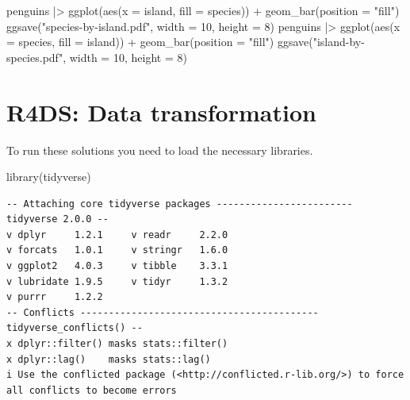 \documentclass[
  letterpaper,
  DIV=11,
  numbers=noendperiod]{scrreprt}
\newenvironment{Shaded}{\begin{snugshade}}{\end{snugshade}}
\newcommand{\AttributeTok}[1]{\textcolor[rgb]{0.40,0.45,0.13}{#1}}
\newcommand{\DecValTok}[1]{\textcolor[rgb]{0.68,0.00,0.00}{#1}}
\newcommand{\FunctionTok}[1]{\textcolor[rgb]{0.28,0.35,0.67}{#1}}
\newcommand{\NormalTok}[1]{\textcolor[rgb]{0.00,0.23,0.31}{#1}}
\newcommand{\SpecialCharTok}[1]{\textcolor[rgb]{0.37,0.37,0.37}{#1}}
\newcommand{\StringTok}[1]{\textcolor[rgb]{0.13,0.47,0.30}{#1}}
\begin{document}
\begin{Shaded}
\begin{Highlighting}[]
\NormalTok{penguins }\SpecialCharTok{|\textgreater{}}
  \FunctionTok{ggplot}\NormalTok{(}\FunctionTok{aes}\NormalTok{(}\AttributeTok{x =}\NormalTok{ island, }\AttributeTok{fill =}\NormalTok{ species)) }\SpecialCharTok{+}
  \FunctionTok{geom\_bar}\NormalTok{(}\AttributeTok{position =} \StringTok{"fill"}\NormalTok{)}
\FunctionTok{ggsave}\NormalTok{(}\StringTok{"species{-}by{-}island.pdf"}\NormalTok{, }\AttributeTok{width =} \DecValTok{10}\NormalTok{, }\AttributeTok{height =} \DecValTok{8}\NormalTok{)}
\NormalTok{penguins }\SpecialCharTok{|\textgreater{}}
  \FunctionTok{ggplot}\NormalTok{(}\FunctionTok{aes}\NormalTok{(}\AttributeTok{x =}\NormalTok{ species, }\AttributeTok{fill =}\NormalTok{ island)) }\SpecialCharTok{+}
  \FunctionTok{geom\_bar}\NormalTok{(}\AttributeTok{position =} \StringTok{"fill"}\NormalTok{)}
\FunctionTok{ggsave}\NormalTok{(}\StringTok{"island{-}by{-}species.pdf"}\NormalTok{, }\AttributeTok{width =} \DecValTok{10}\NormalTok{, }\AttributeTok{height =} \DecValTok{8}\NormalTok{)}
\end{Highlighting}
\end{Shaded}

\chapter{R4DS: Data transformation}\label{r4ds-data-transformation}

To run these solutions you need to load the necessary libraries.

\begin{Shaded}
\begin{Highlighting}[]
\FunctionTok{library}\NormalTok{(tidyverse)}
\end{Highlighting}
\end{Shaded}

\begin{verbatim}
-- Attaching core tidyverse packages ------------------------ tidyverse 2.0.0 --
v dplyr     1.2.1     v readr     2.2.0
v forcats   1.0.1     v stringr   1.6.0
v ggplot2   4.0.3     v tibble    3.3.1
v lubridate 1.9.5     v tidyr     1.3.2
v purrr     1.2.2     
-- Conflicts ------------------------------------------ tidyverse_conflicts() --
x dplyr::filter() masks stats::filter()
x dplyr::lag()    masks stats::lag()
i Use the conflicted package (<http://conflicted.r-lib.org/>) to force all conflicts to become errors
\end{verbatim}
\end{document}
